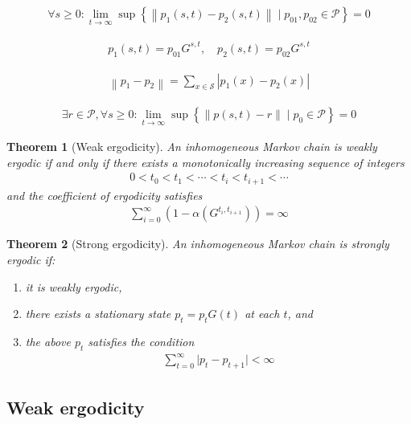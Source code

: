 \documentclass{article}
\newtheorem{theorem}{Theorem}
\begin{document}
\begin{align*}
\forall s \geq 0: \lim _{t \rightarrow \infty} \sup\left\{\left\|p_{1}(s, t)-p_{2}(s, t)\right\| \mid p_{01}, p_{02} \in \mathcal{P}\right\}=0
\tag{9.69}
\end{align*}

\begin{align*}
p_{1}(s, t)=p_{01} G^{s, t}, \quad p_{2}(s, t)=p_{02} G^{s, t}
\tag{9.70}
\end{align*}

\begin{align*}
\left\|p_{1}-p_{2}\right\|=\sum_{x \in \mathcal{S}}\left|p_{1}(x)-p_{2}(x)\right|
\tag{9.71}
\end{align*}

\begin{align*}
\exists r \in \mathcal{P}, \forall s \geq 0: \lim _{t \rightarrow \infty} \sup\left\{\|p(s, t)-r\| \mid p_{0} \in \mathcal{P}\right\}=0
\tag{9.72}
\end{align*}

\begin{theorem}[Weak ergodicity]
An inhomogeneous Markov chain is weakly ergodic if and only if there exists a monotonically increasing sequence of integers
\begin{align*}
0 < t_{0} < t_{1} < \cdots < t_{i} < t_{i+1} < \cdots
\end{align*}
and the coefficient of ergodicity satisfies
\begin{align*}
\sum_{i=0}^{\infty} (1 - \alpha (G^{t_{i}, t_{i+1}})) = \infty
\tag{9.73}
\end{align*}
\end{theorem}

\begin{theorem}[Strong ergodicity]
An inhomogeneous Markov chain is strongly ergodic if:
\begin{enumerate}
    \item it is weakly ergodic,
    \item there exists a stationary state \(p_{t} = p_{t} G(t)\) at each \(t\), and
    \item the above \(p_{t}\) satisfies the condition
\begin{align*}
\sum_{t=0}^{\infty}\lvert p_{t}-p_{t+1} \rvert < \infty
\tag{9.74}
\end{align*}
\end{enumerate}
\end{theorem}

\subsection{Weak ergodicity}
\end{document}
